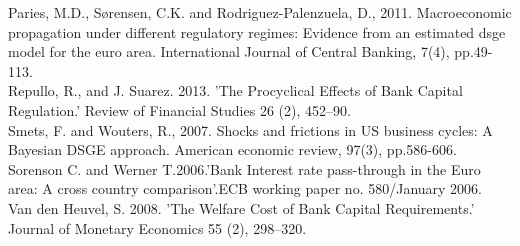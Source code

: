 \documentclass[12pt]{article}
\numberwithin{equation}{section}
\begin{document}
Paries, M.D., Sørensen, C.K. and Rodriguez-Palenzuela, D., 2011. Macroeconomic propagation under different regulatory regimes: Evidence from an estimated dsge model for the euro area. International Journal of Central Banking, 7(4), pp.49-113. \\


Repullo, R., and J. Suarez. 2013. 'The Procyclical Effects of Bank
Capital Regulation.' Review of Financial Studies 26 (2), 452–90.\\

Smets, F. and Wouters, R., 2007. Shocks and frictions in US business cycles: A Bayesian DSGE approach. American economic review, 97(3), pp.586-606. \\

Sorenson C. and Werner T.2006.'Bank Interest rate pass-through in the Euro area: A cross country comparison'.ECB working paper no. 580/January 2006.\\



Van den Heuvel, S. 2008. 'The Welfare Cost of Bank Capital
Requirements.' Journal of Monetary Economics 55 (2), 298–320.\\
\end{document}
